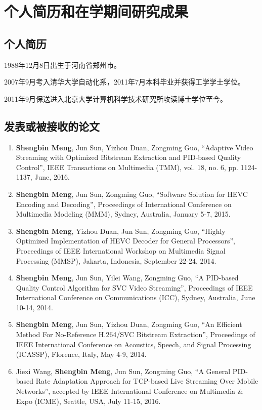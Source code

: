 \chapter{个人简历和在学期间研究成果}

\section*{个人简历}

1988年12月8日出生于河南省郑州市。

2007年9月考入清华大学自动化系，2011年7月本科毕业并获得工学学士学位。

2011年9月保送进入北京大学计算机科学技术研究所攻读博士学位至今。

\renewcommand{\labelenumi}{[\arabic{enumi}]}

\section*{发表或被接收的论文}
\begin{enumerate}
	\item \textbf{Shengbin Meng}, Jun Sun, Yizhou Duan, Zongming Guo, ``Adaptive Video Streaming with Optimized Bitstream Extraction and PID-based Quality Control'', IEEE Transactions on Multimedia (TMM), vol. 18, no. 6, pp. 1124-1137, June, 2016.
	\item \textbf{Shengbin Meng}, Jun Sun, Zongming Guo, ``Software Solution for HEVC Encoding and Decoding'', Proceedings of International Conference on Multimedia Modeling (MMM), Sydney, Australia, January 5-7, 2015.
	\item \textbf{Shengbin Meng}, Yizhou Duan, Jun Sun, Zongming Guo, ``Highly Optimized Implementation of HEVC Decoder for General Processors'', Proceedings of IEEE International Workshop on Multimedia Signal Processing (MMSP), Jakarta, Indonesia, September 22-24, 2014.
	\item \textbf{Shengbin Meng}, Jun Sun, Yilei Wang, Zongming Guo, ``A PID-based Quality Control Algorithm for SVC Video Streaming'', Proceedings of IEEE International Conference on Communications (ICC), Sydney, Australia, June 10-14, 2014.
	\item \textbf{Shengbin Meng}, Jun Sun, Yizhou Duan, Zongming Guo, ``An Efficient Method For No-Reference H.264/SVC Bitstream Extraction'', Proceedings of IEEE International Conference on Acoustics, Speech, and Signal Processing (ICASSP), Florence, Italy, May 4-9, 2014.
	\item Jiexi Wang, \textbf{Shengbin Meng}, Jun Sun, Zongming Guo, ``A General PID-based Rate Adaptation Approach for TCP-based Live Streaming Over Mobile Networks'', accepted by IEEE International Conference on Multimedia \& Expo (ICME), Seattle, USA, July 11-15, 2016.
\end{enumerate}

